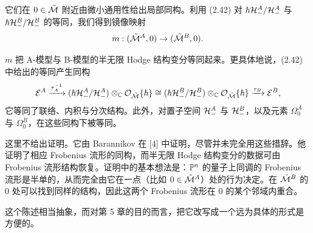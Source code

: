 它们在 $0\in\tilde{\mathcal{M}}$ 附近由微小通用性给出局部同构。利用 (2.42) 对 $\hbar\mathcal{H}^{A}_-/\mathcal{H}^{A}_-$ 与 $\hbar\mathcal{H}^{B}_-/\mathcal{H}^{B}_-$ 的等同，我们得到镜像映射
\[
  m:(\tilde{\mathcal{M}}^{A},0)\to(\tilde{\mathcal{M}}^{B},0).
\]

\begin{theorem}[$\PP^{n}$ 的镜像对称]
$m$ 把 A-模型与 B-模型的半无限 Hodge 结构变分等同起来。更具体地说，(2.42) 中给出的等同产生同构
\[
  \mathcal{E}^{A}\xrightarrow{\tau_A^{-1}}
  (\hbar\mathcal{H}^{A}_-/\mathcal{H}^{A}_-)\otimes_{\mathbb{C}}\mathcal{O}_{\tilde{\mathcal{M}}}\{\hbar\}
  \cong(\hbar\mathcal{H}^{B}_-/\mathcal{H}^{B}_-)\otimes_{\mathbb{C}}\mathcal{O}_{\tilde{\mathcal{M}}}\{\hbar\}
  \xrightarrow{\tau_B}\mathcal{E}^{B},
\]
它等同了联络、内积与分次结构。此外，对置子空间 $\mathcal{H}^{A}_-$ 与 $\mathcal{H}^{B}_-$，以及元素 $\Omega^{A}_0$ 与 $\Omega^{B}_0$，在这些同构下被等同。
\end{theorem}

这里不给出证明。它由 Barannikov 在 [4] 中证明，尽管并未完全用这些措辞。他证明了相应 Frobenius 流形的同构，而半无限 Hodge 结构变分的数据可由 Frobenius 流形结构恢复。证明中的基本想法是：$\PP^{n}$ 的量子上同调的 Frobenius 流形是半单的，从而完全由它在一点（比如 $0\in\tilde{\mathcal{M}}^{A}$）处的行为决定。在 $\tilde{\mathcal{M}}^{B}$ 的 $0$ 处可以找到同样的结构，因此这两个 Frobenius 流形在 $0$ 的某个邻域内重合。


这个陈述相当抽象，而对第 5 章的目的而言，把它改写成一个远为具体的形式是方便的。

